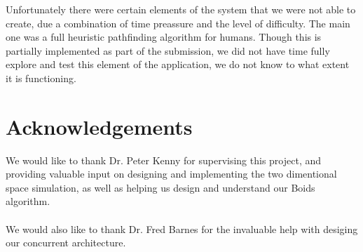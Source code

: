 \documentclass[10pt, a4paper, conference, compsocconf]{IEEEtran}
\begin{document}
Unfortunately there were certain elements of the system that we were not able to create, due a combination of time preassure and the level of difficulty. The main one was a full heuristic pathfinding algorithm for humans. Though this is partially implemented as part of the submission, we did not have time fully explore and test this element of the application, we do not know to what extent it is functioning.

\section{Acknowledgements}
We would like to thank Dr. Peter Kenny for supervising this project, and providing valuable input on designing and implementing the two dimentional space simulation, as well as helping us design and understand our Boids algorithm.\\
\\
We would also like to thank Dr. Fred Barnes for the invaluable help with desiging our concurrent architecture.

\end{document}
